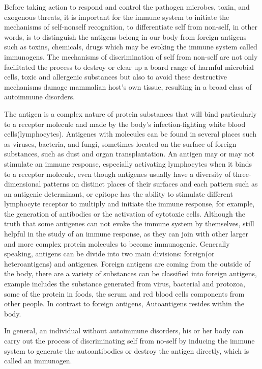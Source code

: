 \documentclass[12pt]{article}
\begin{document}
Before taking action to respond and control the pathogen microbes, toxin, and exogenous threats, it is important for the immune system to initiate the mechanisms of self-nonself recognition, to differentiate self from non-self, in other words, is to distinguish the antigens belong in our body from foreign antigens such as toxins, chemicals, drugs which may be evoking the immune system called immunogens. The mechanisms of discrimination of self from non-self are not only facilitated the process to destroy or clear up a board range of harmful microbial cells, toxic and allergenic substances but also to avoid these destructive mechanisms damage mammalian host's own tissue, resulting in a broad class of autoimmune disorders.\medskip

The antigen is a complex nature of protein substances that will bind particularly to a receptor molecule and made by the body's infection-fighting white blood cells(lymphocytes). Antigenes with molecules can be found in several places such as viruses, bacteria, and fungi, sometimes located on the surface of foreign substances, such as dust and organ transplantation. An antigen may or may not stimulate an immune response, especially activating lymphocytes when it binds to a receptor molecule, even though antigenes usually have a diversity of three-dimensional patterns on distinct places of their surfaces and each pattern such as an antigenic determinant, or epitope has the ability to stimulate different lymphocyte receptor to multiply and initiate the immune response, for example, the generation of antibodies or the activation of cytotoxic cells. Although the truth that some antigenes can not evoke the immune system by themselves, still helpful in the study of an immune response, as they can join with other larger and more complex protein molecules to become immunogenic. Generally speaking, antigens can be divide into two main divisions: foreign(or heteroantigens) and antigenes. 
Foreign antigens are coming from the outside of the body, there are a variety of substances can be classified into foreign antigens, example includes the substance generated from virus, bacterial and protozoa, some of the protein in foods, the serum and red blood cells components from other people. In contrast to foreign antigens, Autoantigens resides within the body.\medskip

In general, an individual without autoimmune disorders, his or her body can carry out the process of discriminating self from no-self by inducing the immune system to generate the autoantibodies or destroy the antigen directly, which is called an immunogen.
\end{document}
